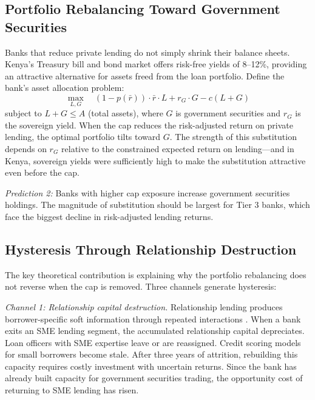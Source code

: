 \documentclass[12pt]{article}
\begin{document}
\subsection{Portfolio Rebalancing Toward Government Securities}

Banks that reduce private lending do not simply shrink their balance sheets. Kenya's Treasury bill and bond market offers risk-free yields of 8--12\%, providing an attractive alternative for assets freed from the loan portfolio. Define the bank's asset allocation problem:
\begin{equation}
    \max_{L, G} \quad (1 - p(\bar{r})) \cdot \bar{r} \cdot L + r_G \cdot G - c(L + G)
    \label{eq:portfolio}
\end{equation}
subject to $L + G \leq A$ (total assets), where $G$ is government securities and $r_G$ is the sovereign yield. When the cap reduces the risk-adjusted return on private lending, the optimal portfolio tilts toward $G$. The strength of this substitution depends on $r_G$ relative to the constrained expected return on lending---and in Kenya, sovereign yields were sufficiently high to make the substitution attractive even before the cap.

\textit{Prediction 2:} Banks with higher cap exposure increase government securities holdings. The magnitude of substitution should be largest for Tier 3 banks, which face the biggest decline in risk-adjusted lending returns.

\subsection{Hysteresis Through Relationship Destruction}

The key theoretical contribution is explaining why the portfolio rebalancing does not reverse when the cap is removed. Three channels generate hysteresis:

\textit{Channel 1: Relationship capital destruction.} Relationship lending produces borrower-specific soft information through repeated interactions \citep{petersen1994benefits, boot2000can, bolton2016relationship}. When a bank exits an SME lending segment, the accumulated relationship capital depreciates. Loan officers with SME expertise leave or are reassigned. Credit scoring models for small borrowers become stale. After three years of attrition, rebuilding this capacity requires costly investment with uncertain returns. Since the bank has already built capacity for government securities trading, the opportunity cost of returning to SME lending has risen.
\end{document}
